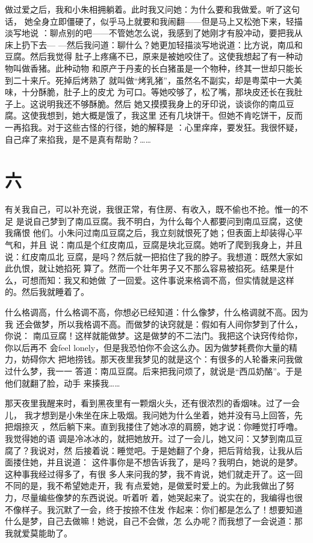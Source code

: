 做过爱之后，我和小朱相拥躺着。此时我又问她：为什么要和我做爱。听了这句话，
她全身立即僵硬了，似乎马上就要和我闹翻——但是马上又松弛下来，轻描淡写地说
：聊点别的吧——不管她怎么说，我感到了她刚才有股冲动，要把我从床上扔下去—
—然后我问道：聊什么？她更加轻描淡写地说道：比方说，南瓜和豆腐。然后我觉得
肚子上疼痛不已，原来是被她咬住了。这使我想起了有一种动物叫做香猪。此种动物
和原产于丹麦的长白猪虽是一个物种，终其一世却只能长到二十来斤。死掉后烤熟了
就叫做“烤乳猪”，虽然名不副实，却是粤菜中一大美味，十分酥脆，肚子上的皮尤
为可口。等她咬够了，松了嘴，那块皮还长在我肚子上。这说明我还不够酥脆。然后
她又摸摸我身上的牙印说，谈谈你的南瓜豆腐。这使我想到，她大概是饿了，我这里
还有几块饼干。但她不肯吃饼干，反而一再掐我。对于这些古怪的行径，她的解释是
：心里痒痒，要发狂。我很怀疑，自己痒了来掐我，是不是真有帮助？……

\section{六}

有关我自己，可以补充说，我很正常，有住房、有收入，既不偷也不抢。惟一的不足
是说自己梦到了南瓜豆腐。我不明白，为什么每个人都要问到南瓜豆腐，这使我痛恨
他们。小朱问过南瓜豆腐之后，我立刻就恨死了她；但表面上却装得心平气和，并且
说：南瓜是个红皮南瓜，豆腐是块北豆腐。她听了爬到我身上，并且说：红皮南瓜北
豆腐，是吗？然后就一把掐住了我的脖子。我想道：既然大家如此仇恨，就让她掐死
算了。然而一个壮年男子又不那么容易被掐死。结果是什么，可想而知：我又和她做
了一回爱。这件事说来格调不高，但实情就是这样的。然后我就睡着了。

什么格调高，什么格调不高，你想必已经知道：什么像梦，什么格调就不高。因为我
还会做梦，所以我格调不高。而做梦的诀窍就是：假如有人间你梦到了什么，你说：
南瓜豆腐！这样就能做梦。这是做梦的不二法门。我把这个诀窍传给你，你以后再不
会feel lonely，但是我恐怕你不会这么办。因为做梦耗费你大量的精力，妨碍你大
把地捞钱。那天夜里我梦见的就是这个：有很多的人轮番来问我做过什么梦，我一一
答道：南瓜豆腐。后来把我问烦了，就说是“西瓜奶酪”。于是他们就翻了脸，动手
来揍我……

那天夜里我醒来时，看到黑夜里有一颗烟火头，还有很浓烈的香烟味。过了一会儿，
我才想到是小朱坐在床上吸烟。我问她为什么坐着，她并没有马上回答，先把烟捺灭
，然后躺下来。直到我搂住了她冰凉的肩膀，她才说：你睡觉打呼噜。我觉得她的语
调是冷冰冰的，就把她放开。过了一会儿，她又问：又梦到南瓜豆腐了？我说对，然
后接着说：睡觉吧。于是她翻了个身，把后背给我，让我从后面搂住她，并且说道：
这件事你是不想告诉我了，是吗？我明白，她说的是梦。这种事我经过得多了，有很
多人来问我的梦，我不肯说，她们就走开了。这一回不同的是，我不希望她走开，我
有点爱她，是做爱时爱上的。为此我做出了努力，尽量编些像梦的东西说说。听着听
着，她哭起来了。说实在的，我编得也很不像样子。我沉默了一会，终于按捺不住发
作起来：你们都是怎么了！想要知道什么是梦，自己去做嘛！她说，自己不会做，怎
么办呢？而我想了一会说道：那我就爱莫能助了。
